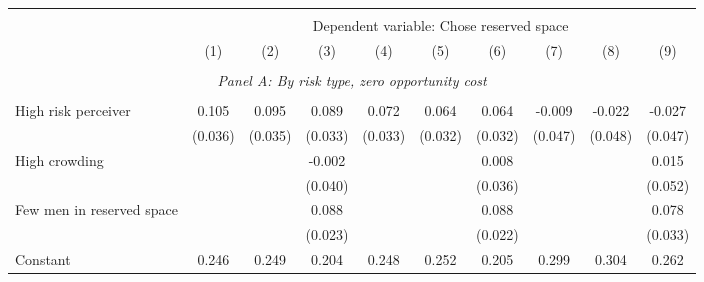 \begin{tabular}{l*{9}{c}} \hline\hline \\[-1.8ex] & \multicolumn{9}{c}{Dependent variable: Chose reserved space} \\ 
                    &\multicolumn{1}{c}{(1)}         &\multicolumn{1}{c}{(2)}         &\multicolumn{1}{c}{(3)}         &\multicolumn{1}{c}{(4)}         &\multicolumn{1}{c}{(5)}         &\multicolumn{1}{c}{(6)}         &\multicolumn{1}{c}{(7)}         &\multicolumn{1}{c}{(8)}         &\multicolumn{1}{c}{(9)}         \\
 \hline \\[-1ex] \multicolumn{10}{c}{\textit{Panel A: By risk type, zero opportunity cost}} \\\\[-1ex]
High risk perceiver &       0.105\sym{***}&       0.095\sym{***}&       0.089\sym{***}&       0.072\sym{**} &       0.064\sym{*}  &       0.064\sym{**} &      -0.009         &      -0.022         &      -0.027         \\
                    &     (0.036)         &     (0.035)         &     (0.033)         &     (0.033)         &     (0.032)         &     (0.032)         &     (0.047)         &     (0.048)         &     (0.047)         \\
[1em]
High crowding       &                     &                     &      -0.002         &                     &                     &       0.008         &                     &                     &       0.015         \\
                    &                     &                     &     (0.040)         &                     &                     &     (0.036)         &                     &                     &     (0.052)         \\
[1em]
Few men in reserved space&                     &                     &       0.088\sym{***}&                     &                     &       0.088\sym{***}&                     &                     &       0.078\sym{**} \\
                    &                     &                     &     (0.023)         &                     &                     &     (0.022)         &                     &                     &     (0.033)         \\
[1em]
Constant            &       0.246\sym{***}&       0.249\sym{***}&       0.204\sym{***}&       0.248\sym{***}&       0.252\sym{***}&       0.205\sym{***}&       0.299\sym{***}&       0.304\sym{***}&       0.262\sym{***}\\

\end{tabular}
